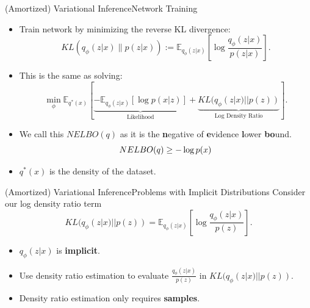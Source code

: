 \documentclass[handout]{beamer}
\newcommand{\E}{\mathbb{E}}
\begin{document}
\begin{frame}{(Amortized) Variational Inference}{Network Training}
\begin{itemize}
\item Train network by minimizing the reverse KL divergence:
\[KL(q_\phi(z|x)\|p(z|x)):=\mathbb{E}_{q_\phi(z|x)}\left[\log \frac{q_\phi(z|x)}{p(z|x)}\right].\]
\item This is the same as solving:
\[\min_\phi \E_{q^*(x)}[\underbrace{-\mathbb{E}_{q_\phi(z|x)}[\log p(x|z)]}_{\text{Likelihood}}+\underbrace{KL(q_\phi(z|x)||p(z))}_{\text{Log Density Ratio}}].\]
\item We call this $NELBO(q)$ as it is the \textbf{n}egative of \textbf{e}vidence \textbf{l}ower \textbf{bo}und.
\[\small NELBO(q)\geq -\log p(x)\]
\item $q^*(x)$ is the density of the dataset.
\end{itemize}
\end{frame}
\begin{frame}{(Amortized) Variational Inference}{Problems with Implicit Distributions}
Consider our log density ratio term
\[KL(q_\phi(z|x)||p(z))=\E_{q_\phi(z|x)}\left[\log \frac{q_\phi(z|x)}{p(z)}\right].\]
\begin{itemize}
\item $q_\phi(z|x)$ is \textbf{implicit}.
\vspace{0.2cm}
\item Use density ratio estimation to evaluate $\frac{q_\phi(z|x)}{p(z)}$ in $KL(q_\phi(z|x)||p(z))$.
\vspace{0.2cm}
\item Density ratio estimation only requires \textbf{samples}.
\end{itemize}
\end{frame}
\end{document}
